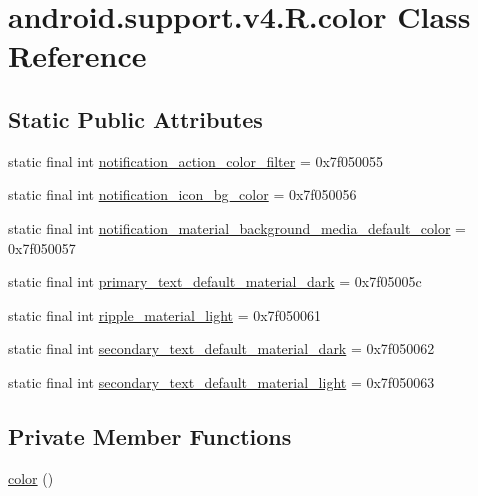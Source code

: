 \hypertarget{classandroid_1_1support_1_1v4_1_1_r_1_1color}{}\section{android.\+support.\+v4.\+R.\+color Class Reference}
\label{classandroid_1_1support_1_1v4_1_1_r_1_1color}
\subsection*{Static Public Attributes}
\begin{DoxyCompactItemize}
\item 
static final int \mbox{\hyperlink{classandroid_1_1support_1_1v4_1_1_r_1_1color_a0e6bd1dee1ba3fbdaf9466f8716e4724}{notification\+\_\+action\+\_\+color\+\_\+filter}} = 0x7f050055
\item 
static final int \mbox{\hyperlink{classandroid_1_1support_1_1v4_1_1_r_1_1color_ab31163590b2202e9c99716a3eee564da}{notification\+\_\+icon\+\_\+bg\+\_\+color}} = 0x7f050056
\item 
static final int \mbox{\hyperlink{classandroid_1_1support_1_1v4_1_1_r_1_1color_a5e6f79ec370cb9b2e6dc5493bba175df}{notification\+\_\+material\+\_\+background\+\_\+media\+\_\+default\+\_\+color}} = 0x7f050057
\item 
static final int \mbox{\hyperlink{classandroid_1_1support_1_1v4_1_1_r_1_1color_ab6983fecb0a5d2f6bfc32106c5eeb217}{primary\+\_\+text\+\_\+default\+\_\+material\+\_\+dark}} = 0x7f05005c
\item 
static final int \mbox{\hyperlink{classandroid_1_1support_1_1v4_1_1_r_1_1color_a6fcf1c0f464f5ab3338b9c81e4adac49}{ripple\+\_\+material\+\_\+light}} = 0x7f050061
\item 
static final int \mbox{\hyperlink{classandroid_1_1support_1_1v4_1_1_r_1_1color_af44009899b1c7f45700c05018473df2a}{secondary\+\_\+text\+\_\+default\+\_\+material\+\_\+dark}} = 0x7f050062
\item 
static final int \mbox{\hyperlink{classandroid_1_1support_1_1v4_1_1_r_1_1color_a3cc6c4f9f00257e09e9f62fbbcef9823}{secondary\+\_\+text\+\_\+default\+\_\+material\+\_\+light}} = 0x7f050063
\end{DoxyCompactItemize}
\subsection*{Private Member Functions}
\begin{DoxyCompactItemize}
\item 
\mbox{\hyperlink{classandroid_1_1support_1_1v4_1_1_r_1_1color_a67527abc01aa30286b974dc8f77e4bfc}{color}} ()
\end{DoxyCompactItemize}


